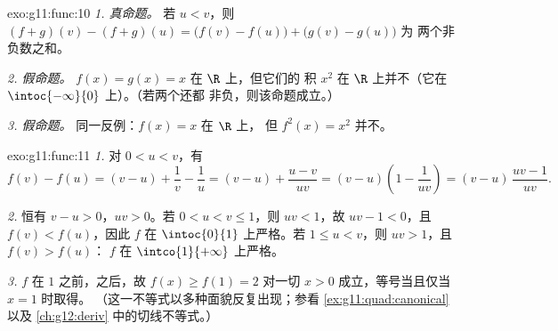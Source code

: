 \begin{solution}{exo:g11:func:10}
\emph{1. 真命题。} 若 $u < v$，则
$(f+g)(v) - (f+g)(u) = \bigl(f(v)-f(u)\bigr) + \bigl(g(v)-g(u)\bigr)$ 为
两个非负数之和。

\emph{2. 假命题。} $f(x) = g(x) = x$ 在 $\R$ 上，但它们的
积 $x^2$ 在 $\R$ 上并不（它在
$\intoc{-\infty}{0}$ 上）。（若两个还都
非负，则该命题成立。）

\emph{3. 假命题。} 同一反例：$f(x) = x$ 在 $\R$ 上，
但 $f^2(x) = x^2$ 并不。
\end{solution}

\begin{solution}{exo:g11:func:11}
\emph{1.} 对 $0 < u < v$，有
\[
f(v) - f(u) = (v - u) + \frac1v - \frac1u
= (v - u) + \frac{u - v}{uv}
= (v - u)\left(1 - \frac{1}{uv}\right)
= (v - u)\,\frac{uv - 1}{uv}.
\]

\emph{2.} 恒有 $v - u > 0$，$uv > 0$。若 $0 < u < v \leq 1$，则
$uv < 1$，故 $uv - 1 < 0$，且 $f(v) < f(u)$，因此 $f$ 在
$\intoc{0}{1}$ 上严格。若 $1 \leq u < v$，则 $uv > 1$，且 $f(v) > f(u)$：
$f$ 在 $\intco{1}{+\infty}$ 上严格。

\emph{3.} $f$ 在 $1$ 之前，之后，故
$f(x) \geq f(1) = 2$ 对一切 $x > 0$ 成立，等号当且仅当 $x = 1$ 时取得。
（这一不等式以多种面貌反复出现；参看
\cref{ex:g11:quad:canonical} 以及
\cref{ch:g12:deriv} 中的切线不等式。）
\end{solution}

